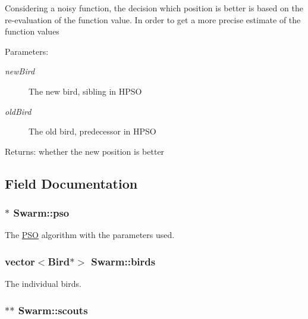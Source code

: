 Considering a noisy function, the decision which position is better is based on the re-evaluation of the function value. In order to get a more precise estimate of the function values \begin{Desc}
\item[Parameters:]
\begin{description}
\item[{\em newBird}]The new bird, sibling in HPSO \item[{\em oldBird}]The old bird, predecessor in HPSO \end{description}
\end{Desc}
\begin{Desc}
\item[Returns:]whether the new position is better \end{Desc}


\subsection{Field Documentation}
\hypertarget{classSwarm_0e0ea6b1259774c2b2390536e936bcfc}{
\subsubsection{$\ast$ {\bf Swarm::pso}}}
\label{classSwarm_0e0ea6b1259774c2b2390536e936bcfc}


The \hyperlink{classPSO}{PSO} algorithm with the parameters used. 

\hypertarget{classSwarm_74191c7a473df093f5537f8d6d5ca1a6}{
\subsubsection{\setlength{\rightskip}{0pt plus 5cm}vector$<${\bf Bird}$\ast$$>$ {\bf Swarm::birds}}}
\label{classSwarm_74191c7a473df093f5537f8d6d5ca1a6}


The individual birds. 

\hypertarget{classSwarm_9520522dd61ae47abc1781be180c01e3}{
\subsubsection{$\ast$$\ast$ {\bf Swarm::scouts}}}
\label{classSwarm_9520522dd61ae47abc1781be180c01e3}


